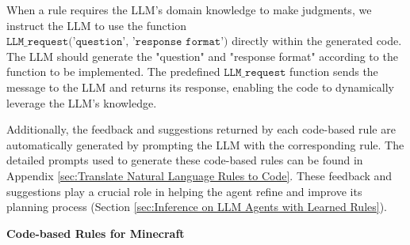 \documentclass{article} %
\begin{document}
When a rule requires the LLM's domain knowledge to make judgments, we instruct the LLM to use the function $\texttt{LLM\_request('question', 'response format')}$ directly within the generated code. The LLM should generate the "question" and "response format" according to the function to be implemented. The predefined $\texttt{LLM\_request}$ function sends the message to the LLM and returns its response, enabling the code to dynamically leverage the LLM's knowledge.

Additionally, the feedback and suggestions returned by each code-based rule are automatically generated by prompting the LLM with the corresponding rule. The detailed prompts used to generate these code-based rules can be found in Appendix \ref{sec:Translate Natural Language Rules to Code}. These feedback and suggestions play a crucial role in helping the agent refine and improve its planning process (Section \ref{sec:Inference on LLM Agents with Learned Rules}).

\begin{center}
    \textbf{Code-based Rules for Minecraft}
\end{center}
\end{document}
